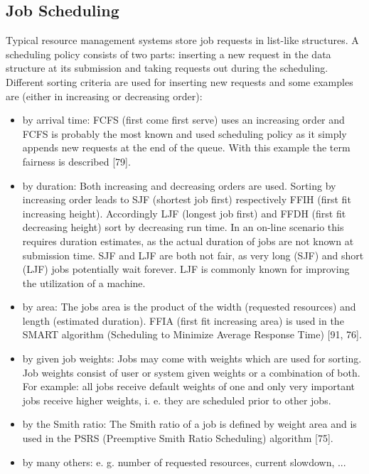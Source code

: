 \subsection{Job Scheduling}
Typical resource management systems store job requests in list-like structures. A scheduling policy consists of two parts: inserting a new request in the data structure at its submission and taking requests out during the scheduling. Different sorting criteria are used for inserting new requests and some examples are (either in increasing or decreasing order):
\begin{itemize}
\item by arrival time: FCFS (first come first serve) uses an increasing order and FCFS is probably the most known and used scheduling policy as it simply appends new requests at the end of the queue. With this example the term fairness is described [79]. 
\item by duration: Both increasing and decreasing orders are used. Sorting by increasing order leads to SJF (shortest job first) respectively FFIH (first fit increasing height). Accordingly LJF (longest job first) and FFDH (first fit decreasing height) sort by decreasing run time. In an on-line scenario this requires duration estimates, as the actual duration of jobs are not known at submission time. SJF and LJF are both not fair, as very long (SJF) and short (LJF) jobs potentially wait forever. LJF is commonly known for improving the utilization of a machine.
\item by area: The jobs area is the product of the width (requested resources) and length (estimated duration). FFIA (first fit increasing area) is used in the SMART algorithm (Scheduling to Minimize Average Response Time) [91, 76]. 
\item by given job weights: Jobs may come with weights which are used for sorting. Job weights consist of user or system given weights or a combination of both. For example: all jobs receive default weights of one and only very important jobs receive higher weights, i. e. they are scheduled prior to other jobs.
\item by the Smith ratio: The Smith ratio of a job is defined by weight area and is used in the PSRS (Preemptive Smith Ratio Scheduling) algorithm [75].
\item by many others: e. g. number of requested resources, current slowdown, ...
\end{itemize}

